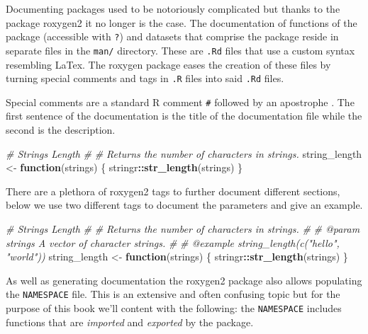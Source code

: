 \documentclass[
]{krantz}
\makeatletter
\newenvironment{Shaded}{\begin{snugshade}}{\end{snugshade}}
\newcommand{\CommentTok}[1]{\textcolor[rgb]{0.37,0.37,0.37}{\textit{#1}}}
\newcommand{\ControlFlowTok}[1]{\textcolor[rgb]{0.27,0.27,0.27}{\textbf{#1}}}
\newcommand{\KeywordTok}[1]{\textcolor[rgb]{0.27,0.27,0.27}{\textbf{#1}}}
\newcommand{\NormalTok}[1]{#1}
\newcommand{\OperatorTok}[1]{\textcolor[rgb]{0.43,0.43,0.43}{\textbf{#1}}}
\newcommand{\StringTok}[1]{\textcolor[rgb]{0.5,0.5,0.5}{#1}}
\newenvironment{kframe}{%
\medskip{}
\setlength{\fboxsep}{.8em}
 \def\at@end@of@kframe{}%
 \ifinner\ifhmode%
  \def\at@end@of@kframe{\end{minipage}}%
  \begin{minipage}{\columnwidth}%
 \fi\fi%
 \def\FrameCommand##1{\hskip\@totalleftmargin \hskip-\fboxsep
 \colorbox{shadecolor}{##1}\hskip-\fboxsep
     \hskip-\linewidth \hskip-\@totalleftmargin \hskip\columnwidth}%
 \MakeFramed {\advance\hsize-\width
   \@totalleftmargin\z@ \linewidth\hsize
   \@setminipage}}%
 {\par\unskip\endMakeFramed%
 \at@end@of@kframe}
\renewenvironment{Shaded}{\begin{kframe}}{\end{kframe}}
\makeatother
\begin{document}
Documenting packages used to be notoriously complicated but thanks to the package roxygen2 it no longer is the case. The documentation of functions of the package (accessible with \texttt{?}) and datasets that comprise the package reside in separate files in the \texttt{man/} directory. These are \texttt{.Rd} files that use a custom syntax resembling LaTex. The roxygen package eases the creation of these files by turning special comments and tags in \texttt{.R} files into said \texttt{.Rd} files.

Special comments are a standard R comment \texttt{\#} followed by an apostrophe \texttt{\textquotesingle{}}. The first sentence of the documentation is the title of the documentation file while the second is the description.

\begin{Shaded}
\begin{Highlighting}[]
\CommentTok{\#\textquotesingle{} Strings Length}
\CommentTok{\#\textquotesingle{} }
\CommentTok{\#\textquotesingle{} Returns the number of characters in strings. }
\NormalTok{string\_length \textless{}{-}}\StringTok{ }\ControlFlowTok{function}\NormalTok{(strings) \{}
\NormalTok{  stringr}\OperatorTok{::}\KeywordTok{str\_length}\NormalTok{(strings)}
\NormalTok{\}}
\end{Highlighting}
\end{Shaded}

There are a plethora of roxygen2 tags to further document different sections, below we use two different tags to document the parameters and give an example.

\begin{Shaded}
\begin{Highlighting}[]
\CommentTok{\#\textquotesingle{} Strings Length}
\CommentTok{\#\textquotesingle{} }
\CommentTok{\#\textquotesingle{} Returns the number of characters in strings. }
\CommentTok{\#\textquotesingle{} }
\CommentTok{\#\textquotesingle{} @param strings A vector of character strings.}
\CommentTok{\#\textquotesingle{} }
\CommentTok{\#\textquotesingle{} @example string\_length(c("hello", "world"))}
\NormalTok{string\_length \textless{}{-}}\StringTok{ }\ControlFlowTok{function}\NormalTok{(strings) \{}
\NormalTok{  stringr}\OperatorTok{::}\KeywordTok{str\_length}\NormalTok{(strings)}
\NormalTok{\}}
\end{Highlighting}
\end{Shaded}

As well as generating documentation the roxygen2 package also allows populating the \texttt{NAMESPACE} file. This is an extensive and often confusing topic but for the purpose of this book we'll content with the following: the \texttt{NAMESPACE} includes functions that are \emph{imported} and \emph{exported} by the package.
\end{document}
